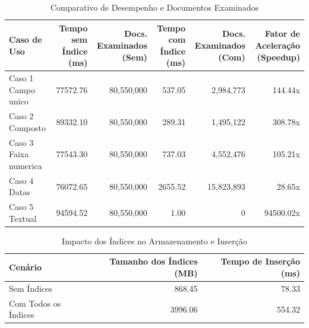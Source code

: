 \begin{table}[htpb]
\centering
\caption{Comparativo de Desempenho e Documentos Examinados}
\label{tab:resultados}
\begin{tabular}{l|rr|rr|r}
\hline
\textbf{Caso de Uso} & \textbf{Tempo sem Índice (ms)} & \textbf{Docs. Examinados (Sem)} & \textbf{Tempo com Índice (ms)} & \textbf{Docs. Examinados (Com)} & \textbf{Fator de Aceleração (Speedup)} \\
\hline
Caso 1 Campo unico & 77572.76 & 80,550,000 & 537.05 & 2,984,773 & 144.44x \\
Caso 2 Composto & 89332.10 & 80,550,000 & 289.31 & 1,495,122 & 308.78x \\
Caso 3 Faixa numerica & 77543.30 & 80,550,000 & 737.03 & 4,552,476 & 105.21x \\
Caso 4 Datas & 76072.65 & 80,550,000 & 2655.52 & 15,823,893 & 28.65x \\
Caso 5 Textual & 94594.52 & 80,550,000 & 1.00 & 0 & 94500.02x \\
\hline
\end{tabular}
\end{table}

\begin{table}[htpb]
\centering
\caption{Impacto dos Índices no Armazenamento e Inserção}
\label{tab:impacto_indices}
\begin{tabular}{l|rr}
\hline
\textbf{Cenário} & \textbf{Tamanho dos Índices (MB)} & \textbf{Tempo de Inserção (ms)} \\
\hline
Sem Índices & 868.45 & 78.33 \\
Com Todos os Índices & 3996.06 & 554.32 \\
\hline
\end{tabular}
\end{table}